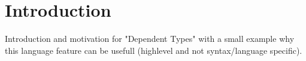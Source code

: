 \section{Introduction}
Introduction and motivation for "Dependent Types" with a small example why this language feature can be usefull (highlevel and not syntax/language specific).